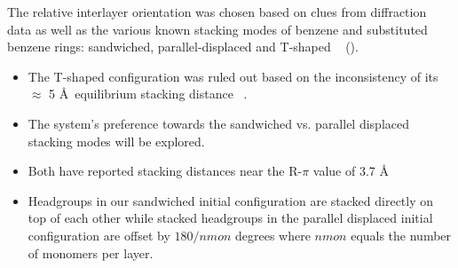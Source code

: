 \documentclass{article}
\newcommand{\angstrom}{\textup{\AA}}
\begin{document}
  
  The relative interlayer orientation was chosen based on clues from 
  diffraction data as well as the various known stacking modes of benzene 
  and substituted benzene rings: sandwiched, parallel-displaced and T-shaped
  ~\cite{sinnokrot_estimates_2002} ().
  \begin{itemize}
    \item The T-shaped configuration was ruled out based on the inconsistency of
    its $\approx$ 5 \angstrom~equilibrium stacking distance ~\cite{sinnokrot_estimates_2002}.
    \item The system's preference towards the sandwiched vs. parallel displaced 
    stacking modes will be explored.
    \item Both have reported stacking distances near the R-$\pi$ value of 3.7 \angstrom %
    \item Headgroups in our sandwiched initial configuration are stacked directly
    on top of each other while stacked headgroups in the parallel displaced 
    initial configuration are offset by $180/nmon$ degrees where $nmon$ equals
    the number of monomers per layer.
  \end{itemize}
\end{document}

